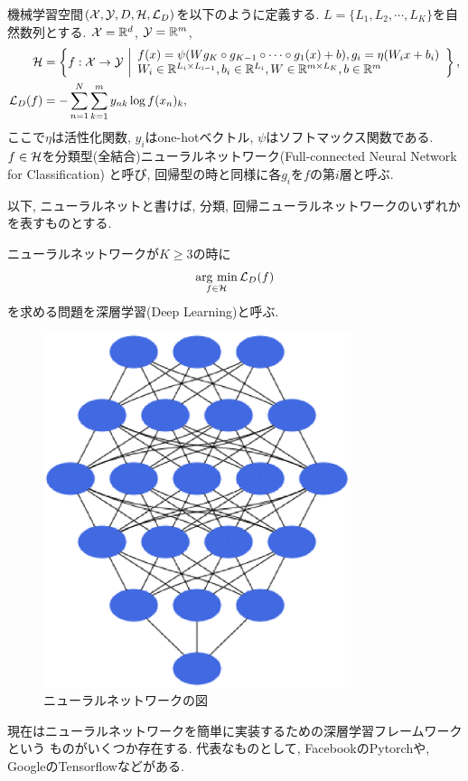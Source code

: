 \begin{Defi}[分類型ニューラルネットワーク]
    機械学習空間$(\mathcal{X}, \mathcal{Y}, D, \mathcal{H}, \mathcal{L}_{D})$を以下のように定義する. $L = \{L_{1}, L_{2}, \cdots, L_{K}\}$を自然数列とする.
    $\mathcal{X} = \mathbb{R}^d$, $\mathcal{Y} = \mathbb{R}^{m}$, 
    \begin{align*}
        \mathcal{H} &= \left\{f:\mathcal{X}\to\mathcal{Y}~\middle|
        \begin{array}{l}
            f(x) = \psi(W g_{K}\circ g_{K - 1}\circ\cdots\circ g_{1}(x) + b), g_{i} = \eta(W_{i}x + b_{i})\\
            W_{i}\in\mathbb{R}^{L_{i}\times L_{i - 1}}, b_{i}\in\mathbb{R}^{L_{i}}, W\in\mathbb{R}^{m\times L_{K}}, b\in\mathbb{R}^{m}
        \end{array}
        \right\},\\
        \mathcal{L}_{D}(f) &= -\sum_{n = 1}^{N}\sum_{k = 1}^{m}y_{nk}\log f(x_n)_{k},
    \end{align*}
    ここで$\eta$は活性化関数, $y_{i}$はone-hotベクトル, $\psi$はソフトマックス関数である. $f\in\mathcal{H}$を分類型(全結合)ニューラルネットワーク(Full-connected Neural Network for Classification)
    と呼び, 回帰型の時と同様に各$g_{i}$を$f$の第$i$層と呼ぶ.
\end{Defi}
以下, ニューラルネットと書けば, 分類, 回帰ニューラルネットワークのいずれかを表すものとする. 
\begin{Defi}[深層学習]
    ニューラルネットワークが$K \geq 3$の時に
    \begin{align*}
        \mathop{\rm arg~min}\limits_{f\in\mathcal{H}}\mathcal{L}_{D}(f)
    \end{align*}
    を求める問題を深層学習(Deep Learning)と呼ぶ.
\end{Defi}
\begin{figure}[H]
    \centering
    \includegraphics[width = 9.0cm, angle=90]{Images/NN.eps}
    \caption{ニューラルネットワークの図}
\end{figure}
\begin{Rem}[フレームワーク]
    現在はニューラルネットワークを簡単に実装するための深層学習フレームワークという
    ものがいくつか存在する. 代表なものとして, FacebookのPytorchや, GoogleのTensorflowなどがある.
\end{Rem}
